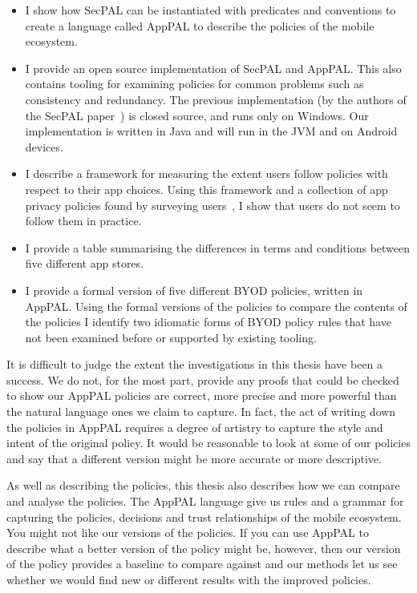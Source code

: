 \documentclass[thesis.tex]{subfiles}
\begin{document}
\begin{itemize}
  \item I show how SecPAL can be instantiated with predicates and conventions
    to create a language called AppPAL to describe the policies of the mobile
    ecosystem.
  \item I provide an open source implementation of SecPAL and AppPAL. This also
    contains tooling for examining policies for common problems such as
    consistency and redundancy.  The previous implementation (by the authors of
    the SecPAL paper~\cite{becker_secpal:_2006}) is closed source, and runs
    only on Windows.  Our implementation is written in Java and will run in the
    JVM and on Android devices.
  \item I describe a framework for measuring the extent users follow policies
    with respect to their app choices.  Using this framework and a collection
    of app privacy policies found by surveying users~\cite{lin_modeling_2014},
    I show that users do not seem to follow them in practice.
  \item I provide a table summarising the differences in terms and conditions
    between five different app stores.
  \item I provide a formal version of five different \ac{BYOD} policies, written in
    AppPAL.  Using the formal versions of the policies to compare the contents
    of the policies I identify two idiomatic forms of \ac{BYOD} policy rules that
    have not been examined before or supported by existing tooling.
\end{itemize}

It is difficult to judge the extent the investigations in this thesis have been
a success.  We do not, for the most part, provide any proofs that could be
checked to show our AppPAL policies are correct, more precise and more powerful
than the natural language ones we claim to capture.  In fact, the act of writing
down the policies in AppPAL requires a degree of artistry to capture the style
and intent of the original policy. It would be reasonable to look at some of
our policies and say that a different version might be more accurate or more
descriptive.

As well as describing the policies, this thesis also describes how we can
compare and analyse the policies. The AppPAL language give us rules and a
grammar for capturing the policies, decisions and trust relationships of the
mobile ecosystem.  You might not like our versions of the policies. If you can
use AppPAL to describe what a better version of the policy might be, however,
then our version of the policy provides a baseline to compare against and our
methods let us see whether we would find new or different results with the
improved policies.
\end{document}
